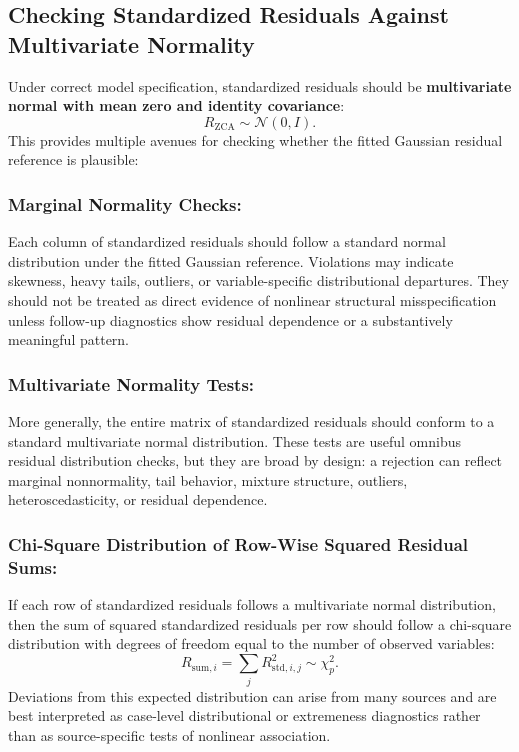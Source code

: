 \documentclass[floatsintext,a4paper]{apa7} %
\begin{document}
	\subsection{Checking Standardized Residuals Against Multivariate Normality}
	Under correct model specification, standardized residuals should be \textbf{multivariate normal with mean zero and identity covariance}:
	$$
R_{\text{ZCA}} \sim \mathcal{N}(0, I).
	$$
	This provides multiple avenues for checking whether the fitted Gaussian residual reference is plausible:
	
	\subsubsection{Marginal Normality Checks:} Each column of standardized residuals should follow a standard normal distribution under the fitted Gaussian reference. Violations may indicate skewness, heavy tails, outliers, or variable-specific distributional departures. They should not be treated as direct evidence of nonlinear structural misspecification unless follow-up diagnostics show residual dependence or a substantively meaningful pattern.
	
	\subsubsection{Multivariate Normality Tests:} More generally, the entire matrix of standardized residuals should conform to a standard multivariate normal distribution. These tests are useful omnibus residual distribution checks, but they are broad by design: a rejection can reflect marginal nonnormality, tail behavior, mixture structure, outliers, heteroscedasticity, or residual dependence.
	
	\subsubsection{Chi-Square Distribution of Row-Wise Squared Residual Sums:} If each row of standardized residuals follows a multivariate normal distribution, then the sum of squared standardized residuals per row should follow a chi-square distribution with degrees of freedom equal to the number of observed variables:
	$$
	R_{\text{sum}, i} = \sum_j R_{\text{std}, i, j}^2 \sim \chi^2_p.
	$$
	Deviations from this expected distribution can arise from many sources and are best interpreted as case-level distributional or extremeness diagnostics rather than as source-specific tests of nonlinear association.
	
\end{document}
